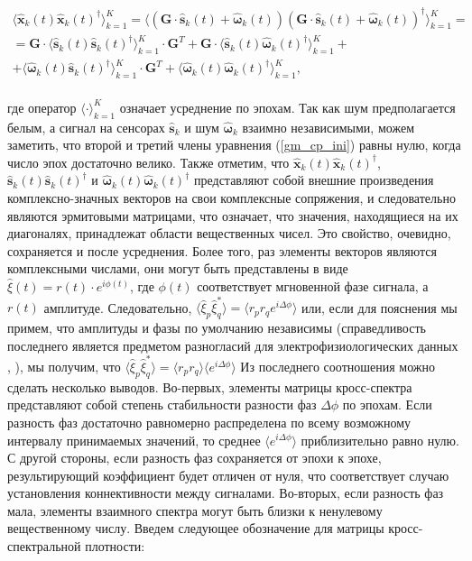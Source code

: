 \begin{gather}
           \langle{\hat{\mathbf{x     }}_k(t) \hat{\mathbf{x}}_k(t)^{\dag}} \rangle_{k=1}^K = 
           \langle{(\mathbf{G} \cdot\hat{\mathbf{s}}_k(t) + \hat{\mathbf{\omega}}_k(t))
                                       (\mathbf{G} \cdot\hat{\mathbf{s}}_k(t) + \hat{\mathbf{\omega}}_k(t))^{\dag}}\rangle_{k=1}^K=\nonumber\\
= \mathbf{G}  \cdot \langle{\hat{\mathbf{s     }}_k(t) \hat{\mathbf{s     }}_k(t)^{\dag}} \rangle_{k=1}^K \cdot \mathbf{G}^T + 
   \mathbf{G} \cdot \langle{\hat{\mathbf{s     }}_k(t) \hat{\mathbf{\omega}}_k(t)^{\dag}} \rangle_{k=1}^K + \nonumber\\
        +  \langle{\hat{\mathbf{\omega}}_k(t) \hat{\mathbf{s     }}_k(t)^{\dag}} \rangle_{k=1}^K \cdot \mathbf{G}^T +
           \langle{\hat{\mathbf{\omega}}_k(t) \hat{\mathbf{\omega}}_k(t)^{\dag}} \rangle_{k=1}^K, 
    \label{gm_cp_ini}
\end{gather}
\\
где оператор $\langle \cdot \rangle_{k=1}^K$ означает усреднение по эпохам. Так как шум предполагается белым, а сигнал на сенсорах $\hat{\mathbf{s}}_k$ и шум $\hat{\mathbf{\omega}}_k$ взаимно независимыми, можем заметить, что второй и третий члены уравнения (\ref{gm_cp_ini}) равны нулю, когда число эпох достаточно велико.
Также отметим, что
$\hat{\mathbf{x     }}_k(t) \hat{\mathbf{x     }}_k(t)^{\dag}$,
$\hat{\mathbf{s     }}_k(t) \hat{\mathbf{s     }}_k(t)^{\dag}$ и
$\hat{\mathbf{\omega}}_k(t) \hat{\mathbf{\omega}}_k(t)^{\dag}$
представляют собой внешние произведения комплексно-значных векторов на свои комплексные сопряжения,
и следовательно являются эрмитовыми матрицами, что означает,
что значения, находящиеся на их диагоналях, принадлежат области вещественных чисел.
Это свойство, очевидно, сохраняется и после усреднения.
Более того, раз элементы векторов являются комплексными числами, они могут быть представлены в виде
$\hat{\xi}(t) = r(t)\cdot e^{i\phi(t)}$, где $\phi(t)$ соответствует мгновенной фазе сигнала,
а $r(t)$ амплитуде. Следовательно,
$\langle \hat{\xi}_p \hat{\xi}_q^* \rangle = \langle r_p r_q e^{i\Delta\phi} \rangle$ или,
если для пояснения мы примем, что амплитуды и фазы по умолчанию независимы (справедливость последнего является предметом разногласий для электрофизиологических данных \cite{Lachaux1999}, \cite{imcoh}),
мы получим, что
$\langle \hat{\xi}_p \hat{\xi}_q^* \rangle = \langle r_p r_q \rangle \langle e^{i\Delta\phi} \rangle$
Из последнего соотношения можно сделать несколько выводов.
Во-первых, элементы матрицы кросс-спектра представляют собой степень стабильности
разности фаз $\Delta\phi$ по эпохам.
Если разность фаз достаточно равномерно распределена по всему возможному
интервалу принимаемых значений, то среднее $\langle e^{i\Delta\phi} \rangle$
приблизительно равно нулю.
С другой стороны, если разность фаз сохраняется от эпохи к эпохе,
результирующий коэффициент будет отличен от нуля,
что соответствует случаю установления коннективности между сигналами.
Во-вторых, если разность фаз мала,
элементы взаимного спектра могут быть близки к ненулевому вещественному числу.
Введем следующее обозначение для матрицы кросс-спектральной плотности: 

